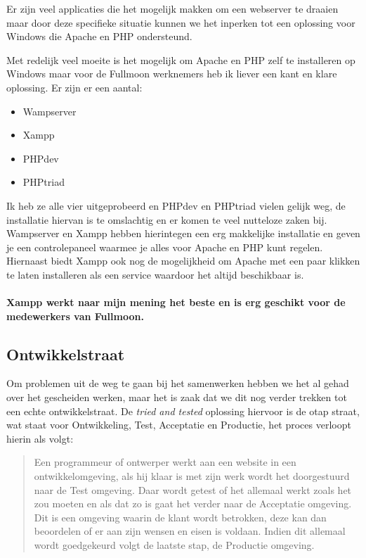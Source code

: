 \documentclass[12pt,a4paper]{article}
\begin{document}
    Er zijn veel applicaties die het mogelijk makken om een webserver te draaien maar door deze specifieke situatie kunnen we het inperken tot een oplossing voor Windows die Apache en PHP ondersteund.
    
    Met redelijk veel moeite is het mogelijk om Apache en PHP zelf te installeren op Windows maar voor de Fullmoon werknemers heb ik liever een kant en klare oplossing. Er zijn er een aantal:
    
    \begin{itemize}
      \item Wampserver
      \item Xampp
      \item PHPdev
      \item PHPtriad
    \end{itemize}
    
    Ik heb ze alle vier uitgeprobeerd en PHPdev en PHPtriad vielen gelijk weg, de installatie hiervan is te omslachtig en er komen te veel nutteloze zaken bij. Wampserver en Xampp hebben hierintegen een erg makkelijke installatie en geven je een controlepaneel waarmee je alles voor Apache en PHP kunt regelen. Hiernaast biedt Xampp ook nog de mogelijkheid om Apache met een paar klikken te laten installeren als een service waardoor het altijd beschikbaar is.
    
    \paragraph{Xampp werkt naar mijn mening het beste en is erg geschikt voor de medewerkers van Fullmoon.}
    
    \subsection{Ontwikkelstraat}
    
    Om problemen uit de weg te gaan bij het samenwerken hebben we het al gehad over het gescheiden werken, maar het is zaak dat we dit nog verder trekken tot een echte ontwikkelstraat. De \emph{tried and tested} oplossing hiervoor is de {\sc otap} straat, wat staat voor Ontwikkeling, Test, Acceptatie en Productie, het proces verloopt hierin als volgt:
    
    \begin{quote}
      Een programmeur of ontwerper werkt aan een website in een ontwikkelomgeving, als hij klaar is met zijn werk wordt het doorgestuurd naar de Test omgeving. Daar wordt getest of het allemaal werkt zoals het zou moeten en als dat zo is gaat het verder naar de Acceptatie omgeving. Dit is een omgeving waarin de klant wordt betrokken, deze kan dan beoordelen of er aan zijn wensen en eisen is voldaan. Indien dit allemaal wordt goedgekeurd volgt de laatste stap, de Productie omgeving.
    \end{quote}
    
\end{document}
